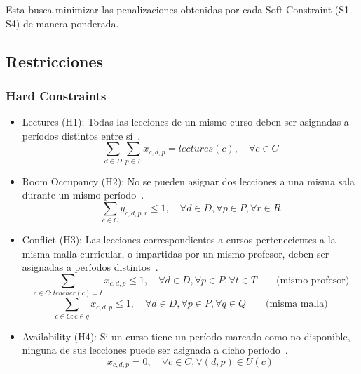 \documentclass[letter, 10pt]{article}
\begin{document}
Esta busca minimizar las penalizaciones obtenidas por cada Soft Constraint (S1 - S4) de manera ponderada. 
\subsection{Restricciones}
\subsubsection{Hard Constraints}
\begin{itemize}
    \item Lectures (H1): Todas las lecciones de un mismo curso deben ser asignadas a per\'iodos distintos entre s\'i~\cite{Hao2011LowerBounds,DiGaspero2007ITC}.
    \[ \sum_{d \in D} \sum_{p \in P} x_{c,d,p} = lectures(c), \quad \forall c \in C \]

    \item Room Occupancy (H2): No se pueden asignar dos lecciones a una misma sala durante un mismo per\'iodo~\cite{Hao2011LowerBounds,DiGaspero2007ITC}.
    \[ \sum_{c \in C} y_{c,d,p,r} \leq 1, \quad \forall d \in D, \forall p \in P, \forall r \in R \]

    \item Conflict (H3): Las lecciones correspondientes a cursos pertenecientes a la misma malla curricular, o impartidas por un mismo profesor, deben ser asignadas a per\'iodos distintos~\cite{Hao2011LowerBounds,Ceschia2023Educational,DiGaspero2007ITC}.
    \[ \sum_{c \in C: teacher(c)=t} x_{c,d,p} \leq 1, \quad \forall d \in D, \forall p \in P, \forall t \in T \qquad \text{(mismo profesor)} \]
    \[ \sum_{c \in C: c \in q} x_{c,d,p} \leq 1, \quad \forall d \in D, \forall p \in P, \forall q \in Q \qquad \text{(misma malla)} \]

    \item Availability (H4): Si un curso tiene un per\'iodo marcado como no disponible, ninguna de sus lecciones puede ser asignada a dicho per\'iodo~\cite{Hao2011LowerBounds,Ceschia2023Educational,DiGaspero2007ITC}.
    \[x_{c,d,p} = 0, \quad \forall c \in C, \forall (d,p) \in U(c)\]
\end{itemize}
\end{document}
